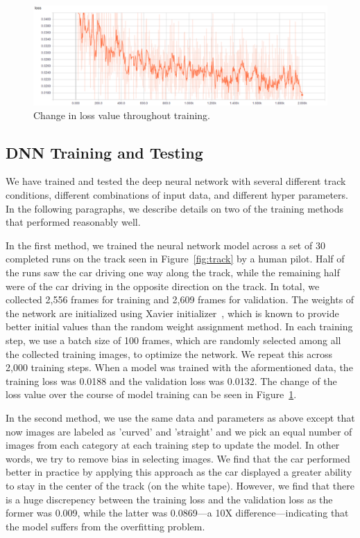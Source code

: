 \begin{figure}[t]
  \centering
  \includegraphics[width=.9\textwidth]{figs/TrainingLoss}
  \caption{Change in loss value throughout training.}
  \label{fig:modelloss}
\end{figure}


\subsection{DNN Training and Testing}
We have trained and tested the deep neural network with several
different track conditions, different combinations of input
data, and different hyper parameters. In the following paragraphs, we 
describe details on two of the training methods that performed 
reasonably well.

In the first method, we trained the neural network model across a set 
of 30 completed runs on the track seen in Figure~\ref{fig:track} by a
human pilot. Half of the runs saw the car driving one way along the
track, while the remaining half were of the car driving in the
opposite direction on the track.
In total, we collected 2,556 frames for training and 2,609 
frames for validation.
The weights of the network are initialized using Xavier
initializer~\cite{Glorot2010}, which is known to provide better
initial values than the random weight assignment method.
In each training step, we use a batch
size of 100 frames, which are randomly selected among all the
collected training images, to optimize the network.
We repeat this across 2,000 training steps. When a model was trained
with the  aformentioned data, the training loss was 0.0188 and the
validation  loss was 0.0132.
The change of the loss value over the course of model training can be
seen in Figure~\ref{fig:modelloss}.

In the second method, we use the same data and parameters as  above 
except that now images are labeled as 'curved' and 'straight' and we pick an
equal number of images from each category at each training step to
update the model. In other words, we try to remove bias in selecting
images. We find that the car performed better in practice by applying
this approach as the car displayed a greater ability to stay in the
center of the track (on the white tape).
However, we find that there is a huge discrepency between the training
loss and the validation loss as the former was 0.009, while the latter
was 0.0869---a 10X difference---indicating that the model suffers from
the overfitting problem.

